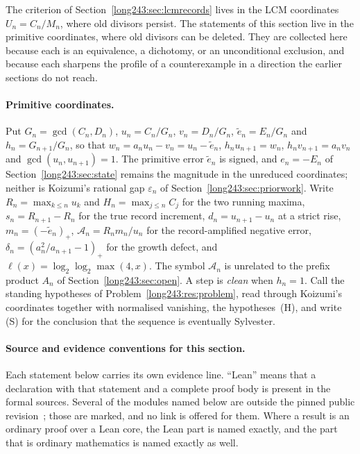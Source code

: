 The criterion of Section~\ref{long243:sec:lcmrecords} lives in the LCM coordinates
$U_n=C_n/M_n$, where old divisors persist.  The statements of this section live
in the primitive coordinates, where old divisors can be deleted.  They are
collected here because each is
an equivalence, a dichotomy, or an unconditional exclusion, and because each
sharpens the profile of a counterexample in a direction the earlier sections do
not reach.

\paragraph{Primitive coordinates.}
Put $G_n=\gcd(C_n,D_n)$, $u_n=C_n/G_n$, $v_n=D_n/G_n$, $\tilde e_n=E_n/G_n$
and $h_n=G_{n+1}/G_n$, so that $w_n=a_nu_n-v_n=u_n-\tilde e_n$,
$h_nu_{n+1}=w_n$, $h_nv_{n+1}=a_nv_n$ and $\gcd(u_n,u_{n+1})=1$.  The primitive
error $\tilde e_n$ is signed, and $e_n=-E_n$ of Section~\ref{long243:sec:state} remains
the magnitude in the unreduced coordinates; neither is Koizumi's rational gap
$\varepsilon_n$ of Section~\ref{long243:sec:priorwork}.  Write $R_n=\max_{k\le n}u_k$ and
$H_n=\max_{j\le n}C_j$ for the two running maxima, $s_n=R_{n+1}-R_n$ for the
true record increment, $d_n=u_{n+1}-u_n$ at a strict rise,
$m_n=(-\tilde e_n)_+$, $\mathcal A_n=R_nm_n/u_n$ for the record-amplified
negative error, $\delta_n=(a_n^2/a_{n+1}-1)_+$ for the growth defect, and
$\ell(x)=\log_2\log_2\max(4,x)$.  The symbol $\mathcal A_n$ is unrelated to the
prefix product $A_n$ of Section~\ref{long243:sec:open}.  A step is \emph{clean} when $h_n=1$.  Call the
standing hypotheses of Problem~\ref{long243:res:problem}, read through Koizumi's
coordinates together with normalised vanishing, the hypotheses~(H), and write
(S) for the conclusion that the sequence is eventually Sylvester.

\paragraph{Source and evidence conventions for this section.}
Each statement below carries its own evidence line.  ``Lean'' means that a
declaration with that statement and a complete proof body is present in the
formal sources.  Several of the modules named below are outside the pinned
public revision~\commitshort; those are marked, and no link is offered for them.
Where a result is an ordinary proof over a Lean core, the Lean part is named
exactly, and the part that is ordinary mathematics is named exactly as well.

